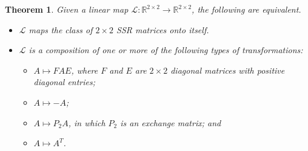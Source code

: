 \documentclass[11pt,reqno]{amsart}
\theoremstyle{plain}
\newtheorem{theorem}{Theorem}[section]
\theoremstyle{definition}
\numberwithin{equation}{section}
\begin{document}
\begin{theorem}\label{Theorem_SSR2}
	Given a linear map $\mathcal{L}:\mathbb{R}^{2\times2}\to\mathbb{R}^{2\times 2}$, the following are equivalent.
	\begin{itemize}
		\item[(1)] $\mathcal{L}$ maps the class of $2\times 2$ SSR matrices onto itself.
		\item[(2)] $\mathcal{L}$ is a composition of one or more of the following types of transformations:
		\begin{itemize}
			\item[(a)] $A\mapsto FAE$, where $F$ and $E$ are $2\times2$ diagonal matrices with positive diagonal entries;
			\item[(b)] $A\mapsto -A$;
			\item[(c)] $A\mapsto P_2A$, in which $P_2$ is an exchange matrix; and
			\item[(d)] $A\mapsto A^T$.
		\end{itemize}
	\end{itemize}
\end{theorem}
\end{document}
